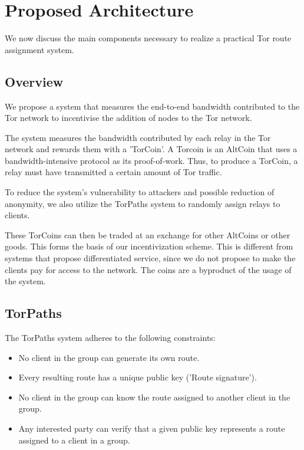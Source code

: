 \section{Proposed Architecture} \label{arch}

We now discuss the main components necessary to realize a practical Tor route assignment system.

\subsection{Overview}
We propose a system that measures the end-to-end bandwidth contributed to the Tor network to incentivise the addition of nodes to the Tor network.

The system measures the bandwidth contributed by each relay in the Tor network and rewards them with a 'TorCoin'. A Torcoin is an AltCoin that uses a bandwidth-intensive protocol as its proof-of-work. Thus, to produce a TorCoin, a relay must have transmitted a certain amount of Tor traffic.

To reduce the system's vulnerability to attackers and possible reduction of anonymity, we also utilize the TorPaths system to randomly assign relays to clients.

These TorCoins can then be traded at an exchange for other AltCoins or other goods. This forms the basis of our incentivization scheme. This is different from systems that propose differentiated service\cite{dovrolis1999case, dovrolis2002proportional}, since we do not propose to make the clients pay for access to the network. The coins are a byproduct of the usage of the system.

\subsection{TorPaths}
The TorPaths system adheres to the following constraints:
\begin{itemize}
  \item No client in the group can generate its own route.
  \item Every resulting route has a unique public key ('Route signature').
  \item No client in the group can know the route assigned to another client in the group.
  \item Any interested party can verify that a given public key represents a route assigned to a client in a group.
\end{itemize}

